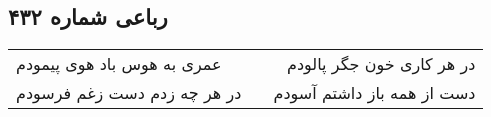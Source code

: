 \begin{center}
\section*{رباعی شماره ۴۳۲}
\label{sec:sh432}
\begin{longtable}{l p{0.5cm} r}
عمری به هوس باد هوی پیمودم
&&
در هر کاری خون جگر پالودم
\\
در هر چه زدم دست زغم فرسودم
&&
دست از همه باز داشتم آسودم
\\
\end{longtable}
\end{center}
